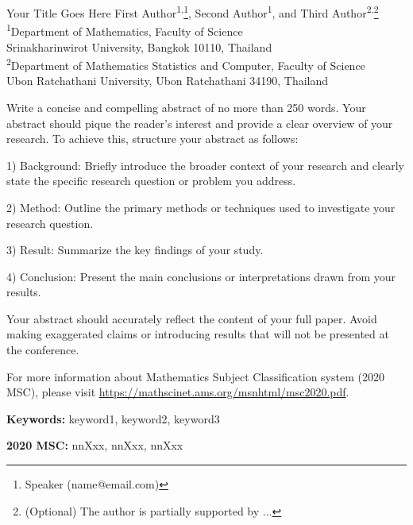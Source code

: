 \documentclass[12pt, a4paper]{article}
\newenvironment{AMM-abstract}[4][]{
  \begin{center}
    { \renewcommand\textsuperscript[1]{}\par}
    {{\Large\bfseries #2}\par}
    \medskip
    {\large #3\par}
    \bigskip
    {\small #4\par}
    \bigskip\bigskip
    {{\large\bfseries Abstract}\par}
  \end{center}
}{ 
  \bigskip
  \hrule
  \bigskip
}
\newcommand{\mykeywords}[1]{%
    \noindent \textbf{Keywords:} #1 \par
}
\newcommand{\myMSC}[1]{
    \noindent \textbf{2020 MSC:} #1 \par
}
\begin{document}
%
%

\begin{AMM-abstract}[]
{Your Title Goes Here} %
{First Author\textsuperscript{1,}\footnote{Speaker (name@email.com)}, Second Author\textsuperscript{1}, and Third Author\textsuperscript{2,}\footnote{(Optional) The author is partially supported by ...}} %
{\textsuperscript{1}Department of Mathematics, Faculty of Science\\Srinakharinwirot University,
Bangkok 10110, Thailand\\ \smallskip
\textsuperscript{2}Department of Mathematics Statistics and Computer, Faculty of Science\\
Ubon Ratchathani University, Ubon Ratchathani 34190, Thailand} %

Write a concise and compelling abstract of no more than 250 words. Your abstract should pique the reader's interest and provide a clear overview of your research.
To achieve this, structure your abstract as follows:

1) Background: Briefly introduce the broader context of your research and clearly state the specific research question or problem you address.
 
2) Method: Outline the primary methods or techniques used to investigate your research question.
 
3) Result: Summarize the key findings of your study.
 
4) Conclusion: Present the main conclusions or interpretations drawn from your results.
 
Your abstract should accurately reflect the content of your full paper. Avoid making exaggerated claims or introducing results that will not be presented at the conference.

For more information about Mathematics Subject Classification system (2020 MSC), please visit \url{https://mathscinet.ams.org/msnhtml/msc2020.pdf}.
\end{AMM-abstract}


\mykeywords{keyword1, keyword2, keyword3} %
\smallskip
\myMSC{nnXxx, nnXxx, nnXxx} %
\end{document}
